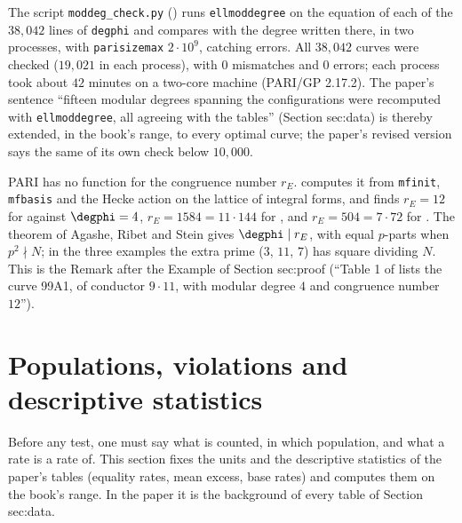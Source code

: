 \begin{sloppypar}
\begin{example}\label{ex:computation:moddeg-check}
The script \texttt{moddeg\_check.py} () runs \texttt{ellmoddegree} on the equation of each of the $38{,}042$
lines of \texttt{degphi} and compares with the degree written there, in two processes, with \texttt{parisizemax} $2\cdot10^9$, catching errors.
All $38{,}042$ curves were checked ($19{,}021$ in each process), with $0$ mismatches and $0$ errors; each process took about $42$ minutes on a
two-core machine (PARI/GP 2.17.2).
The paper's sentence ``fifteen modular degrees spanning the configurations were recomputed with \texttt{ellmoddegree}, all agreeing with the
tables'' (Section sec:data) is thereby extended, in the book's range, to every optimal curve; the paper's revised version says the same of its
own check below $10{,}000$.
\end{example}

\begin{remark}\label{rem:computation:congruence-number}
PARI has no function for the congruence number $r_E$.  computes it from \texttt{mfinit}, \texttt{mfbasis} and the Hecke action on
the lattice of integral forms, and finds $r_E=12$ for  against $\degphi=4$, $r_E=1584=11\cdot144$ for , and $r_E=504=7\cdot72$ for
. The theorem of Agashe, Ribet and Stein \cite[Theorem 2.2]{ARS12} gives $\degphi\mid r_E$, with equal $p$-parts when $p^2\nmid N$; in the
three examples the extra prime ($3$, $11$, $7$) has square dividing $N$. This is the Remark after the Example of Section sec:proof (``Table 1 of
\cite{ARS12} lists the curve 99A1, of conductor $9\cdot11$, with modular degree $4$ and congruence number $12$'').
\end{remark}

\section{Populations, violations and descriptive statistics}\label{sec:computation:populations}

Before any test, one must say what is counted, in which population, and what a rate is a rate of. This section fixes the units and the
descriptive statistics of the paper's tables (equality rates, mean excess, base rates) and computes them on the book's range. In the paper it
is the background of every table of Section sec:data.


\end{sloppypar}
